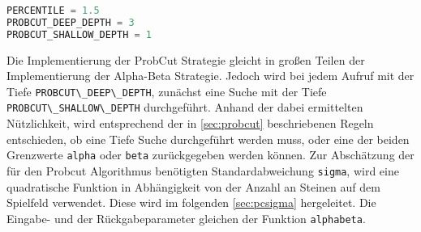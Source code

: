 \begin{lstlisting}[language=Python]
PERCENTILE = 1.5
PROBCUT_DEEP_DEPTH = 3
PROBCUT_SHALLOW_DEPTH = 1
\end{lstlisting}

Die Implementierung der ProbCut Strategie gleicht in großen Teilen der
Implementierung der Alpha-Beta Strategie. Jedoch wird bei jedem Aufruf
mit der Tiefe \passthrough{\lstinline!PROBCUT\_DEEP\_DEPTH!}, zunächst
eine Suche mit der Tiefe
\passthrough{\lstinline!PROBCUT\_SHALLOW\_DEPTH!} durchgeführt. Anhand
der dabei ermittelten Nützlichkeit, wird entsprechend der in
\autoref{sec:probcut} beschriebenen Regeln entschieden, ob eine Tiefe
Suche durchgeführt werden muss, oder eine der beiden Grenzwerte
\passthrough{\lstinline!alpha!} oder \passthrough{\lstinline!beta!}
zurückgegeben werden können. Zur Abschätzung der für den Probcut
Algorithmus benötigten Standardabweichung
\passthrough{\lstinline!sigma!}, wird eine quadratische Funktion in
Abhängigkeit von der Anzahl an Steinen auf dem Spielfeld verwendet.
Diese wird im folgenden \autoref{sec:pcsigma} hergeleitet. Die Eingabe-
und der Rückgabeparameter gleichen der Funktion
\passthrough{\lstinline!alphabeta!}.

